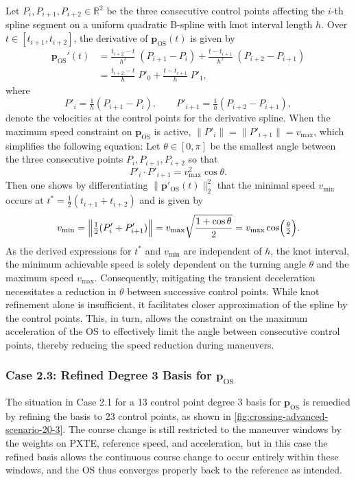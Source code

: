 Let $P_i,P_{i+1},P_{i+2}\in\mathbb R^2$ be the three consecutive control points affecting the $i$-th spline segment on a uniform quadratic B-spline with knot interval length $h$.  Over $t\in[t_{i+1}, t_{i+2}]$, the derivative of $\mathbf p_\text{OS}(t)$ is given by
\begin{equation}
    \begin{aligned}
        \mathbf p_\text{OS}'(t) 
        &=\frac{t_{i+2}-t}{h^2}\;(P_{i+1}-P_i) 
        +\frac{t - t_{i+1}}{h^2}\;(P_{i+2}-P_{i+1})\\
        &=\frac{t_{i+2}-t}{h}\;P'_0
        +\frac{t - t_{i+1}}{h}\;P'_1,
    \end{aligned}
\end{equation}
where
\begin{equation}
P'_i = \tfrac1h (P_{i+1} - P_i),
\qquad
P'_{i+1} = \tfrac1h(P_{i+2} - P_{i+1}),
\end{equation}
denote the velocities at the control points for the derivative spline. When the maximum speed constraint on $\mathbf p_\text{OS}$ is active, $\|P'_i\|=\|P'_{i+1}\|=v_{\max}$, which simplifies the following equation:  Let $\theta\in[0,\pi]$ be the smallest angle between the three consecutive points $P_i,P_{i+1},P_{i+2}$ so that
\begin{equation}
P'_i\cdot P'_{i+1} = v_{\max}^2\cos\theta.
\end{equation}
Then one shows by differentiating $\|\mathbf p'_\text{OS}(t)\|_2^2$ that the minimal speed $v_{\min}$ occurs at $t^*=\tfrac12(t_{i+1}+t_{i+2})$ and is given by
\begin{equation}
v_{\min}
=\Bigl\|\tfrac12(P'_i+P'_{i+1})\Bigr\|
=v_{\max}\sqrt{\frac{1+\cos\theta}{2}}
=v_{\max}\cos\Bigl(\tfrac\theta2\Bigr).
\end{equation}
As the derived expressions for $t^*$ and $v_{\min}$ are independent of $h$, the knot interval, the minimum achievable speed is solely dependent on the turning angle $\theta$ and the maximum speed $v_{\max}$. Consequently, mitigating the transient deceleration necessitates a reduction in $\theta$ between successive control points. While knot refinement alone is insufficient, it facilitates closer approximation of the spline by the control points. This, in turn, allows the constraint on the maximum acceleration of the OS to effectively limit the angle between consecutive control points, thereby reducing the speed reduction during maneuvers.


\subsubsection{Case 2.3: Refined Degree 3 Basis for $\mathbf p_\text{OS}$}
The situation in Case 2.1 for a 13 control point degree 3 basis for $\mathbf p_\text{OS}$ is remedied by refining the basis to 23 control points, as shown in \cref{fig:crossing-advanced-scenario-20-3}. The course change is still restricted to the maneuver windows by the weights on PXTE, reference speed, and acceleration, but in this case the refined basis allows the continuous course change to occur entirely within these windows, and the OS thus converges properly back to the reference as intended.


